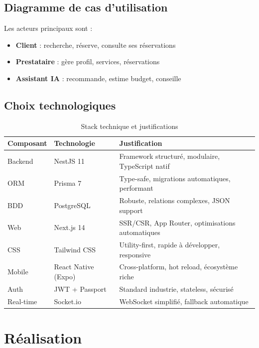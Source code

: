 \documentclass[12pt,a4paper]{report}
\begin{document}
\section{Diagramme de cas d'utilisation}
Les acteurs principaux sont :
\begin{itemize}
  \item \textbf{Client} : recherche, réserve, consulte ses réservations
  \item \textbf{Prestataire} : gère profil, services, réservations
  \item \textbf{Assistant IA} : recommande, estime budget, conseille
\end{itemize}

\section{Choix technologiques}

\begin{table}[H]
\centering
\begin{tabularx}{\textwidth}{|l|l|X|}
\hline
\textbf{Composant} & \textbf{Technologie} & \textbf{Justification} \\
\hline
Backend & NestJS 11 & Framework structuré, modulaire, TypeScript natif \\
\hline
ORM & Prisma 7 & Type-safe, migrations automatiques, performant \\
\hline
BDD & PostgreSQL & Robuste, relations complexes, JSON support \\
\hline
Web & Next.js 14 & SSR/CSR, App Router, optimisations automatiques \\
\hline
CSS & Tailwind CSS & Utility-first, rapide à développer, responsive \\
\hline
Mobile & React Native (Expo) & Cross-platform, hot reload, écosystème riche \\
\hline
Auth & JWT + Passport & Standard industrie, stateless, sécurisé \\
\hline
Real-time & Socket.io & WebSocket simplifié, fallback automatique \\
\hline
\end{tabularx}
\caption{Stack technique et justifications}
\end{table}

\chapter{Réalisation}
\end{document}
